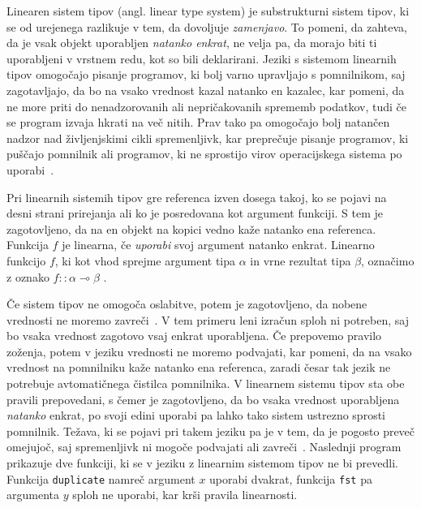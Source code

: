 Linearen sistem tipov (angl. linear type system) je substrukturni sistem tipov, ki se od urejenega razlikuje v tem, da dovoljuje \textit{zamenjavo}. To pomeni, da zahteva, da je vsak objekt uporabljen \textit{natanko enkrat}, ne velja pa, da morajo biti ti uporabljeni v vrstnem redu, kot so bili deklarirani. Jeziki s sistemom linearnih tipov omogočajo pisanje programov, ki bolj varno upravljajo s pomnilnikom, saj zagotavljajo, da bo na vsako vrednost kazal natanko en kazalec, kar pomeni, da ne more priti do nenadzorovanih ali nepričakovanih sprememb podatkov, tudi če se program izvaja hkrati na več nitih. Prav tako pa omogočajo bolj natančen nadzor nad življenjskimi cikli spremenljivk, kar preprečuje pisanje programov, ki puščajo pomnilnik ali programov, ki ne sprostijo virov operacijskega sistema po uporabi~\cite{pierce2004advanced}.


Pri linearnih sistemih tipov gre referenca izven dosega takoj, ko se pojavi na desni strani prirejanja ali ko je posredovana kot argument funkciji. S tem je zagotovljeno, da na en objekt na kopici vedno kaže natanko ena referenca. Funkcija $f$ je linearna, če \textit{uporabi} svoj argument natanko enkrat. Linearno funkcijo $f$, ki kot vhod sprejme argument tipa $\alpha$ in vrne rezultat tipa $\beta$, označimo z oznako $f :: \alpha \multimap \beta$ .


Če sistem tipov ne omogoča oslabitve, potem je zagotovljeno, da nobene vrednosti ne moremo zavreči~\cite{wadler1991there}. V tem primeru leni izračun sploh ni potreben, saj bo vsaka vrednost zagotovo vsaj enkrat uporabljena. Če prepovemo pravilo zoženja, potem v jeziku vrednosti ne moremo podvajati, kar pomeni, da na vsako vrednost na pomnilniku kaže natanko ena referenca, zaradi česar tak jezik ne potrebuje avtomatičnega čistilca pomnilnika. V linearnem sistemu tipov sta obe pravili prepovedani, s čemer je zagotovljeno, da bo vsaka vrednost uporabljena \textit{natanko} enkrat, po svoji edini uporabi pa lahko tako sistem ustrezno sprosti pomnilnik. Težava, ki se pojavi pri takem jeziku pa je v tem, da je pogosto preveč omejujoč, saj spremenljivk ni mogoče podvajati ali zavreči~\cite{wadler1990linear}. Naslednji program prikazuje dve funkciji, ki se v jeziku z linearnim sistemom tipov ne bi prevedli. Funkcija \texttt{duplicate} namreč argument $x$ uporabi dvakrat, funkcija \texttt{fst} pa argumenta $y$ sploh ne uporabi, kar krši pravila linearnosti.

